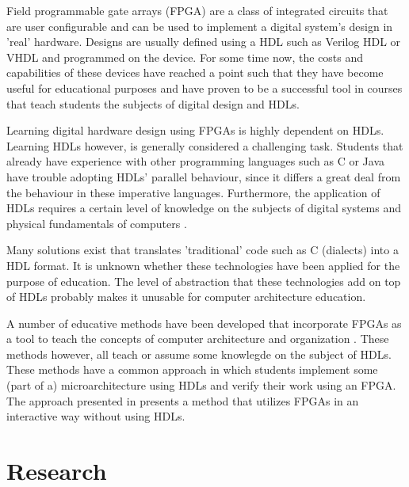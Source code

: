 \documentclass[singleside,openright]{uva-bachelor-thesis}
\begin{document}
Field programmable gate arrays (FPGA) are a class of integrated circuits that are user configurable and can be used to implement a digital system's design in 'real' hardware. Designs are usually defined using a HDL such as Verilog HDL or VHDL and programmed on the device. For some time now, the costs and capabilities of these devices have reached a point such that they have become useful for educational purposes and have proven to be a successful tool in courses that teach students the subjects of digital design and HDLs. 

Learning digital hardware design using FPGAs is highly dependent on HDLs. Learning HDLs however, is generally considered a challenging task. Students that already have experience with other programming languages such as C or Java have trouble adopting HDLs' parallel behaviour, since it differs a great deal from the behaviour in these imperative languages. Furthermore, the application of HDLs requires a certain level of knowledge on the subjects of digital systems and physical fundamentals of computers \cite[p.2]{nativeFPGA}. 

Many solutions exist that translates 'traditional' code such as C (dialects) into a HDL format. It is unknown whether these technologies have been applied for the purpose of education. The level of abstraction that these technologies add on top of HDLs probably makes it unusable for computer architecture education.

A number of educative methods have been developed that incorporate FPGAs as a tool to teach the concepts of computer architecture and organization \cite{nativeFPGA, jansen2014every, nakano2008processor, el2011teaching}. These methods however, all teach or assume some knowlegde on the subject of HDLs. These methods have a common approach in which students implement some (part of a) microarchitecture using HDLs and verify their work using an FPGA. The approach presented in \cite{holland2003harnessing} presents a method that utilizes FPGAs in an interactive way without using HDLs. 

\chapter{Research}
\end{document}
